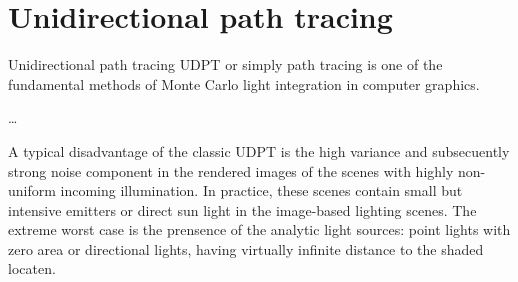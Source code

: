 \section{Unidirectional path tracing}
Unidirectional path tracing \gls{UDPT} or simply path tracing is one of the
fundamental methods of Monte Carlo light integration in computer graphics.

\ldots

A typical disadvantage of the classic \gls{UDPT} is the high variance and
subsecuently strong noise component in the rendered images of the scenes with 
highly non-uniform incoming illumination.
In practice, these scenes contain small but intensive emitters or direct sun
light in the image-based lighting scenes. The extreme worst case is the
prensence of the analytic light sources: point lights with zero area or
directional lights, having virtually infinite distance to the shaded locaten.

